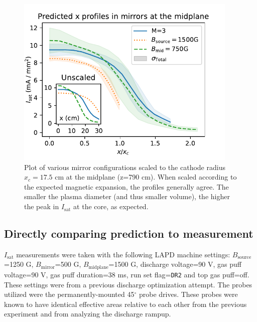 \begin{figure}
	\centering
	\includegraphics[width=300pt]{figures/changing-B-field_M=3_x-prof.pdf}
	\caption[size=12]{\label{fig:changing-B-field_M=3_x-prof}Plot of various mirror configurations scaled to the cathode radius $x_c=17.5$ cm at the midplane (z=790 cm). When scaled according to the expected magnetic expansion, the profiles generally agree. The smaller the plasma diameter (and thus smaller volume), the higher the peak in $I_\text{sat}$ at the core, as expected. }
\end{figure}

\subsection{Directly comparing prediction to measurement}


$I_\text{sat}$ measurements were taken with the following LAPD machine settings: $B_\text{source}$=1250 G, $B_\text{mirror}$=500 G, $B_\text{midplane}$=1500 G, discharge voltage=90 V, gas puff voltage=90 V, gas puff duration=38 ms, run set flag=\texttt{DR2} and top gas puff=off. These settings were from a previous discharge optimization attempt. The probes utilized were the permanently-mounted 45$^\circ$ probe drives. These probes were known to have identical effective areas relative to each other from the previous experiment and from analyzing the discharge rampup.

